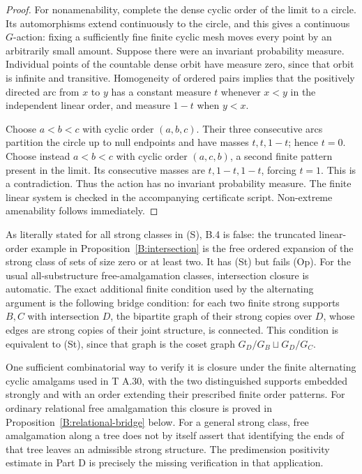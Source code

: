 \begin{proof}
For nonamenability, complete the dense cyclic order of the limit
to a circle. Its automorphisms extend continuously to the circle,
and this gives a continuous $G$-action: fixing a sufficiently fine
finite cyclic mesh moves every point by an arbitrarily small amount.
Suppose there were an invariant probability measure. Individual
points of the countable dense orbit have measure zero, since that
orbit is infinite and transitive. Homogeneity of ordered pairs
implies that the positively directed arc from $x$ to $y$ has a
constant measure $t$ whenever $x<y$ in the independent linear order,
and measure $1-t$ when $y<x$.

Choose $a<b<c$ with cyclic order $(a,b,c)$. Their three consecutive
arcs partition the circle up to null endpoints and have masses
$t,t,1-t$; hence $t=0$. Choose instead $a<b<c$ with cyclic order
$(a,c,b)$, a second finite pattern present in the limit. Its
consecutive masses are $t,1-t,1-t$, forcing $t=1$. This is a
contradiction. Thus the action has no invariant probability
measure. The finite linear system is checked in the accompanying
certificate script. Non-extreme amenability follows immediately.
\end{proof}

\begin{remark}
\label{B:bridge-scope}
As literally stated for all strong classes in (S), B.4 is false:
the truncated linear-order example in Proposition~\ref{B:intersection}
is the free ordered expansion of the strong class of sets of size
zero or at least two. It has (St) but fails (Op). For the usual
all-substructure free-amalgamation classes, intersection closure is
automatic. The exact additional finite condition used by the
alternating argument is the following bridge condition: for each
two finite strong supports $B,C$ with intersection $D$, the
bipartite graph of their strong copies over $D$, whose edges are
strong copies of their joint structure, is connected. This condition
is equivalent to (St), since that graph is the coset graph
$G_D/G_B\sqcup G_D/G_C$.

One sufficient combinatorial way to verify it is closure under the
finite alternating cyclic amalgams used in T A.30, with the two
distinguished supports embedded strongly and with an order extending
their prescribed finite order patterns. For ordinary relational
free amalgamation this closure is proved in
Proposition~\ref{B:relational-bridge} below. For a
general strong class, free amalgamation along a tree does not by
itself assert that identifying the ends of that tree leaves an
admissible strong structure. The predimension positivity estimate
in Part D is precisely the missing verification in that application.
\end{remark}

